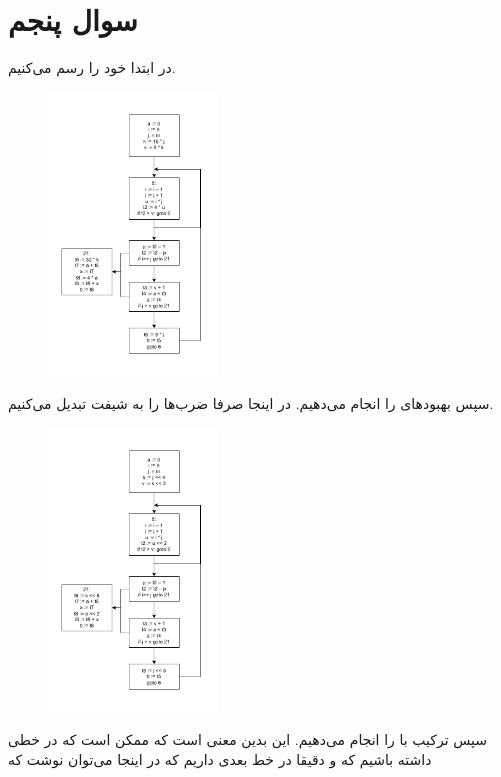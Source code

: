 \documentclass[]{article}
\begin{document}
\section*{سوال پنجم}
در ابتدا خود
را رسم می‌کنیم.
\begin{figure}[H]
    \centering
    \includegraphics[width=0.4\textwidth]{figure/Q5-01-Initial.pdf}
\end{figure}
سپس بهبود‌های
را انجام می‌دهیم. در اینجا صرفا ضرب‌ها را به شیفت تبدیل می‌کنیم.
\begin{figure}[H]
    \centering
    \includegraphics[width=0.4\textwidth]{figure/Q5-02-Arithmetic.pdf}
\end{figure}
سپس ترکیب
با
را انجام می‌دهیم. این بدین معنی است که ممکن است که در خطی داشته باشیم که
و دقیقا در خط بعدی داریم
که در اینجا می‌توان نوشت که
\end{document}
